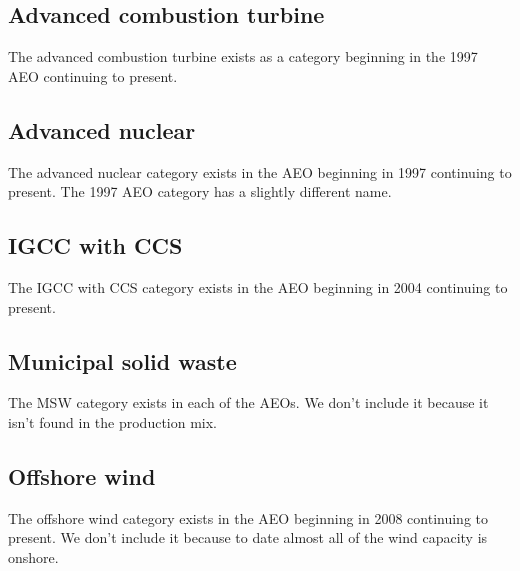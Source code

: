 \documentclass[10pt]{report}
\begin{document}
\subsection{Advanced combustion turbine}
The advanced combustion turbine exists as a category beginning in the 1997 AEO continuing to present. 

\subsection{Advanced nuclear}
The advanced nuclear category exists in the AEO beginning in 1997 continuing to present. 
The 1997 AEO category has a slightly different name. 

\subsection{IGCC with CCS}
The IGCC with CCS category exists in the AEO beginning in 2004 continuing to present. 

\subsection{Municipal solid waste}
The MSW category exists in each of the AEOs. 
We don't include it because it isn't found in the production mix. 

\subsection{Offshore wind}
The offshore wind category exists in the AEO beginning in 2008 continuing to present.  
We don't include it because to date almost all of the wind capacity is onshore.
\end{document}
